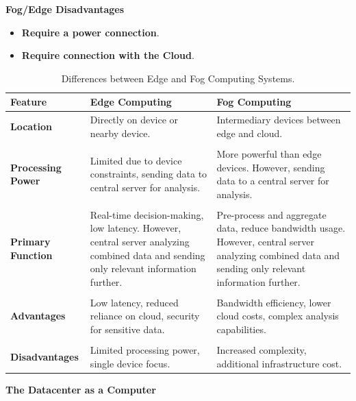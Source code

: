 \begin{flushleft}
    \textcolor{Red2}{ \textbf{Fog/Edge Disadvantages}}
\end{flushleft}
\begin{itemize}
    \item \textbf{Require a power connection}.
    \item \textbf{Require connection with the Cloud}.
\end{itemize}

\newpage

\begin{table}[!htp]
    \centering
    \begin{tabular}{@{} l p{11.5em} p{11.5em} @{}}
        \toprule
        \textbf{Feature} & \textbf{Edge Computing} & \textbf{Fog Computing} \\
        \midrule
        \textbf{Location} & Directly on device or nearby device. & Intermediary devices between edge and cloud. \\
        \\
        \textbf{Processing Power} & Limited due to device constraints, sending data to central server for analysis. & More powerful than edge devices. However, sending data to a central server for analysis. \\
        \\
        \textbf{Primary Function} & Real-time decision-making, low latency. However, central server analyzing combined data and sending only relevant information further. & Pre-process and aggregate data, reduce bandwidth usage. However, central server analyzing combined data and sending only relevant information further. \\
        \\
        \textbf{Advantages} & Low latency, reduced reliance on cloud, security for sensitive data. & Bandwidth efficiency, lower cloud costs, complex analysis capabilities. \\
        \\
        \textbf{Disadvantages} & Limited processing power, single device focus. & Increased complexity, additional infrastructure cost. \\
        \bottomrule
    \end{tabular}
    \caption{Differences between Edge and Fog Computing Systems.}
\end{table}

\newpage

\begin{center}
    \textcolor{Red2}{\textbf{The Datacenter as a Computer}}
\end{center}

